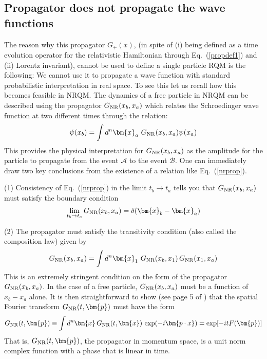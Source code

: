 \documentclass{article}
\def\eq#1{{Eq.~(\ref{#1})}}
\begin{document}
\subsection{Propagator does not propagate the wave functions}


The  reason why this propagator $G_+(x)$, (in spite of (i) being  defined as a time evolution operator for the relativistic Hamiltonian through \eq{propdef1} and (ii)
 Lorentz invariant), cannot be used to define a  single particle RQM is the following: We cannot use it to propagate a wave function with standard probabilistic interpretation in real space. To see this let us recall how this becomes feasible in NRQM.
The dynamics of a free particle in NRQM  can be described using the propagator $G_{\rm NR}(x_b, x_a)$ which relates the Schroedinger wave function at two different times through the relation:
\begin{equation}
 \psi(x_b) = \int d^n \bm{x}_a\ G_{\rm NR}(x_b, x_a) \psi(x_a)
 \label{nrprop} 
\end{equation} 
This provides the physical interpretation for $G_{\rm NR}(x_b, x_a)$ as the amplitude for the particle to propagate from the event $\mathcal{A}$ to the event $\mathcal{B}$. One can immediately draw two key conclusions from the existence of  a relation like \eq{nrprop}.


(1) Consistency of \eq{nrprop} in the limit $t_b\to t_a$ tells you that $G_{\rm NR}(x_b, x_a)$ must satisfy the boundary condition 
 \begin{equation}
  \lim_{t_b\to t_a} G_{\rm NR}(x_b, x_a)=\delta(\bm{x}_b - \bm{x}_a)
  \label{coin1}
 \end{equation} 
 

(2) The propagator must satisfy the transitivity condition (also called the composition law) given by 
 \begin{equation}
  G_{\rm NR}(x_b, x_a) = \int d^n\bm{x}_1\ G_{\rm NR}(x_b, x_1)\,G_{\rm NR}(x_1, x_a)
  \label{complaw}
 \end{equation} 
 This is an extremely stringent condition on the form of the propagator $G_{\rm NR}(x_b, x_a)$. In the case of a free particle,  $G_{\rm NR}(x_b, x_a)$ must be a function of $x_b-x_a$ alone. It is then straightforward to show (see page 5 of \cite{tpqft}) that the spatial Fourier transform $G_{\rm NR}(t, \bm{p})$ must have the form 
 \begin{equation}
  G_{\rm NR}(t, \bm{p}) \equiv \int d^n \bm{x}\, G_{\rm NR}(t, \bm{x})\, \exp(-i\bm{p\cdot x}) = \exp[-itF({\bm{p}})]
  \label{spaceft1}
 \end{equation} 
 That is, $ G_{\rm NR}(t, \bm{p})$, the propagator in momentum space, is a unit norm complex function with a phase that is linear in time. 
 
\end{document}
